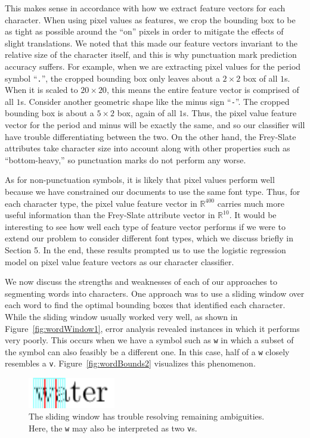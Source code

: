 \documentclass[10pt]{IEEEtran}
\begin{document}
This makes sense in accordance with how we extract feature vectors for each character. When using pixel values as features, we crop the bounding box to be as tight as possible around the ``on'' pixels in order to mitigate the effects of slight translations. We noted that this made our feature vectors invariant to the relative size of the character itself, and this is why punctuation mark prediction accuracy suffers. For example, when we are extracting pixel values for the period symbol ``\texttt{.}'', the cropped bounding box only leaves about a $2 \times 2$ box of all $1$s. When it is scaled to $20 \times 20$, this means the entire feature vector is comprised of all $1$s. Consider another geometric shape like the minus sign ``\texttt{-}''. The cropped bounding box is about a $5 \times 2$ box, again of all $1$s. Thus, the pixel value feature vector for the period and minus will be exactly the same, and so our classifier will have trouble differentiating between the two. On the other hand, the Frey-Slate attributes take character size into account along with other properties such as ``bottom-heavy,'' so punctuation marks do not perform any worse.

As for non-punctuation symbols, it is likely that pixel values perform well because we have constrained our documents to use the same font type. Thus, for each character type, the pixel value feature vector in $\mathbb{R}^{400}$ carries much more useful information than the Frey-Slate attribute vector in $\mathbb{R}^{10}$. It would be interesting to see how well each type of feature vector performs if we were to extend our problem to consider different font types, which we discuss briefly in Section 5. In the end, these results prompted us to use the logistic regression model on pixel value feature vectors as our character classifier.

We now discuss the strengths and weaknesses of each of our approaches to segmenting words into characters. One approach was to use a sliding window over each word to find the optimal bounding boxes that identified each character. While the sliding window usually worked very well, as shown in Figure~\ref{fig:wordWindow1}, error analysis revealed instances in which it performs very poorly. This occurs when we have a symbol such as \texttt{w} in which a subset of the symbol can also feasibly be a different one. In this case, half of a \texttt{w} closely resembles a \texttt{v}. Figure~\ref{fig:wordBounds2} visualizes this phenomenon.

\begin{figure}[h]
  \centering
    \includegraphics[width=1.5in]{word6-window.png}
  \caption{The sliding window has trouble resolving remaining ambiguities. Here, the \texttt{w} may also be interpreted as two \texttt{v}s.}
  \label{fig:wordWindow2}
\end{figure}
\end{document}

